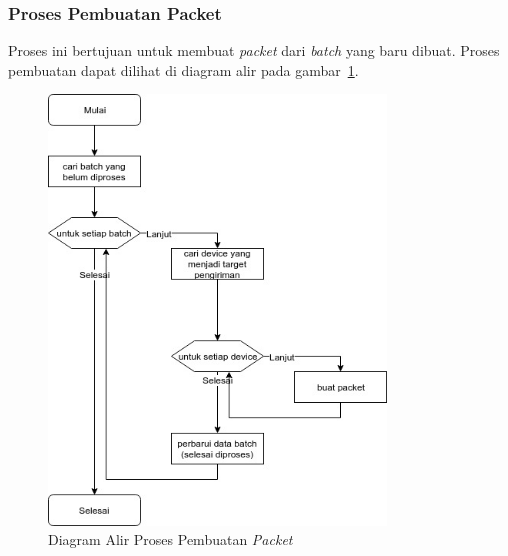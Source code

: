 \subsubsection{Proses Pembuatan Packet}
\par Proses ini bertujuan untuk membuat \textit{packet} dari \textit{batch} yang baru dibuat.
Proses pembuatan dapat
dilihat di diagram alir pada gambar~\ref{flowchart_pembuatan_packet}.
\begin{figure}[H]
    \centering\includegraphics[width=0.8\textwidth]{bab3/figures/flowchart_pembuatan_packet.jpg}
    \caption{Diagram Alir Proses Pembuatan \textit{Packet}}
    \label{flowchart_pembuatan_packet}
\end{figure}

